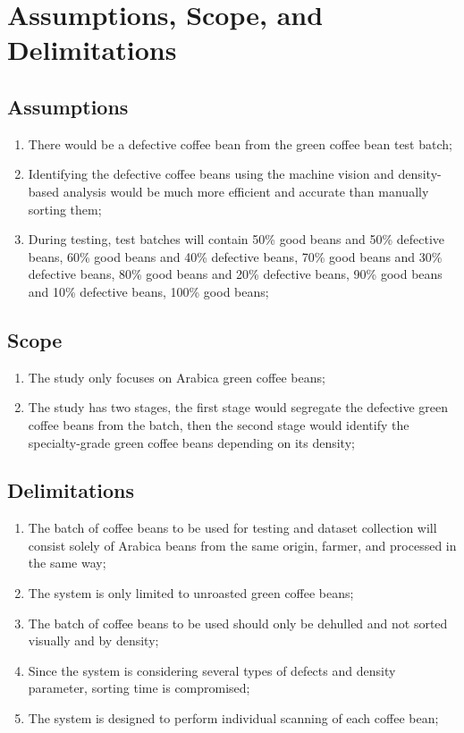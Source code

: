 \section{Assumptions, Scope, and Delimitations}

\subsection{Assumptions}

\begin{enumerate}
	\item There would be a defective coffee bean from the green coffee bean test batch;
	
	\item Identifying the defective coffee beans using the machine vision and density-based analysis would be much more efficient and accurate than manually sorting them;
	
	\item During testing, test batches will contain 50\% good beans and 50\% defective beans, 60\% good beans and 40\% defective beans, 70\% good beans and 30\% defective beans, 80\% good beans and 20\% defective beans, 90\% good beans and 10\% defective beans, 100\% good beans;	
\end{enumerate}

\subsection{Scope}
\begin{enumerate}
	\item The study only focuses on Arabica green coffee beans;
	
	\item The study has two stages, the first stage would segregate the defective green coffee beans from the batch, then the second stage would identify the specialty-grade green coffee beans depending on its density;
\end{enumerate}

\subsection{Delimitations}
\begin{enumerate}
	\item The batch of coffee beans to be used for testing and dataset collection will consist solely of Arabica beans from the same origin, farmer, and processed in the same way;
	
	\item The system is only limited to unroasted green coffee beans;
	
	\item The batch of coffee beans to be used should only be dehulled and not sorted visually and by density;

	\item Since the system is considering several types of defects and density parameter, sorting time is compromised;

	\item The system is designed to perform individual scanning of each coffee bean;
\end{enumerate}

